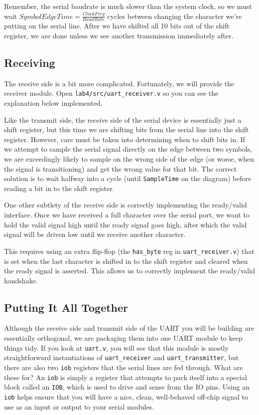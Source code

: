 \documentclass[11pt]{article}
\begin{document}
Remember, the serial baudrate is much slower than the system clock, so we must wait $SymbolEdgeTime = \frac{ClockFreq}{BaudRate}$ cycles between changing the character we're putting on the serial line. After we have shifted all 10 bits out of the shift register, we are done unless we see another transmission immediately after.

\subsection{Receiving}
The receive side is a bit more complicated. Fortunately, we will provide the receiver module. Open \verb|lab4/src/uart_receiver.v| so you can see the explanation below implemented. 

Like the transmit side, the receive side of the serial device is essentially just a shift register, but this time we are shifting bits from the serial line into the shift register. However, care must be taken into determining when to shift bits in. If we attempt to sample the serial signal directly on the edge between two symbols, we are exceedingly likely to sample on the wrong side of the edge (or worse, when the signal is transitioning) and get the wrong value for that bit. The correct solution is to wait halfway into a cycle (until \verb|SampleTime| on the diagram) before reading a bit in to the shift register.

One other subtlety of the receive side is correctly implementing the ready/valid interface. Once we have received a full character over the serial port, we want to hold the valid signal high until the ready signal goes high, after which the valid signal will be driven low until we receive another character. 

This requires using an extra flip-flop (the \verb|has_byte| reg in \verb|uart_receiver.v|) that is set when the last character is shifted in to the shift register and cleared when the ready signal is asserted. This allows us to correctly implement the ready/valid handshake.

\subsection{Putting It All Together}
Although the receive side and transmit side of the UART you will be building are essentially orthogonal, we are packaging them into one UART module to keep things tidy. If you look at \verb|uart.v|, you will see that this module is mostly straightforward instantiations of \verb|uart_receiver| and \verb|uart_transmitter|, but there are also two \verb|iob| registers that the serial lines are fed through. What are these for? An \verb|iob| is simply a register that attempts to pack itself into a special block called an \verb|IOB|, which is used to drive and sense from the IO pins. Using an \verb|iob| helps ensure that you will have a nice, clean, well-behaved off-chip signal to use as an input or output to your serial modules.
\end{document}
